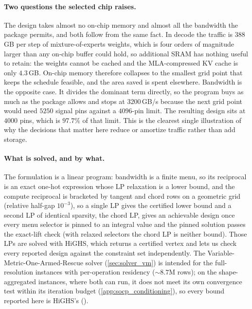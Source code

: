 \paragraph{Two questions the selected chip raises.}
The design takes almost no on-chip memory and almost all the bandwidth the
package permits, and both follow from the same fact. In decode the traffic is
$388$\,GB per step of mixture-of-experts weights, which is four orders of
magnitude larger than any on-chip buffer could hold, so additional SRAM has
nothing useful to retain: the weights cannot be cached and the MLA-compressed KV
cache is only $4.3$\,GB. On-chip memory therefore collapses to the smallest grid
point that keeps the schedule feasible, and the area saved is spent elsewhere.
Bandwidth is the opposite case. It divides the dominant term directly, so the
program buys as much as the package allows and stops at $3200$\,GB/s because the
next grid point would need $5250$ signal pins against a $4096$-pin limit. The
resulting design sits at $4000$ pins, which is $97.7\%$ of that limit. This is
the clearest single illustration of why the decisions that matter here reduce or
amortize traffic rather than add storage.

\paragraph{What is solved, and by what.}
The formulation is a linear program: bandwidth is a finite menu, so its
reciprocal is an exact one-hot expression whose LP relaxation is a lower bound,
and the compute reciprocal is bracketed by tangent and chord rows on a geometric
grid (relative half-gap $10^{-3}$), so a single LP gives the certified lower bound and
a second LP of identical sparsity, the chord LP, gives an achievable design once
every menu selector is pinned to an integral value and the pinned solution
passes the exact-lift check (with relaxed selectors the chord LP is neither
bound). Those LPs are solved with HiGHS, which returns a
certified vertex and lets us check every reported design against the constraint
set independently. The Variable-Metric-One-Armed-Rescue solver
(\cref{sec:solver_vm}) is intended for the full-resolution instances with
per-operation residency (${\sim}8.7$M rows); on the shape-aggregated instances,
where both can run, it does not meet its own convergence test within its
iteration budget (\cref{app:socp_conditioning}), so every bound reported here
is HiGHS's ().


